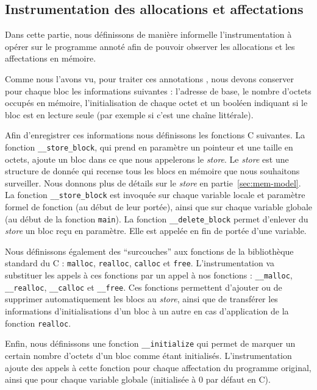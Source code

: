 \subsection{Instrumentation des allocations et affectations}


Dans cette partie, nous définissons de manière informelle l'instrumentation à
opérer sur le programme annoté afin de pouvoir observer les allocations et
les affectations en mémoire.

Comme nous l'avons vu, pour traiter ces annotations \eacsl, nous devons
conserver pour chaque bloc les informations suivantes : l'adresse de base, le
nombre d'octets occupés en mémoire, l'initialisation de chaque octet et un
booléen indiquant si le bloc est en lecture seule (par exemple si c'est une
chaîne littérale).

Afin d'enregistrer ces informations nous définissons les fonctions C suivantes.
La fonction \lstinline'__store_block', qui prend en paramètre un pointeur et une
taille en octets, ajoute un bloc dans ce que nous appelerons le \textit{store}.
Le \textit{store} est une structure de donnée qui recense tous les blocs en
mémoire que nous souhaitons surveiller.
Nous donnons plus de détails sur le \textit{store} en
partie~\ref{sec:mem-model}.
La fonction \lstinline'__store_block' est invoquée sur chaque variable locale
et paramètre formel de fonction (au début de leur portée), ainsi que sur chaque
variable globale (au début de la fonction \lstinline'main').
La fonction \lstinline'__delete_block' permet d'enlever du \textit{store} un
bloc reçu en paramètre.
Elle est appelée en fin de portée d'une variable.

Nous définissons également des ``surcouches'' aux fonctions de la bibliothèque
standard du C : \lstinline'malloc', \lstinline'realloc', \lstinline'calloc' et
\lstinline'free'.
L'instrumentation va substituer les appels à ces fonctions par un appel à nos
fonctions : \lstinline'__malloc', \lstinline'__realloc', \lstinline'__calloc'
et \lstinline'__free'.
Ces fonctions permettent d'ajouter ou de supprimer automatiquement les blocs
au \textit{store}, ainsi que de transférer les informations d'initialisations
d'un bloc à un autre en cas d'application de la fonction \lstinline'realloc'.

Enfin, nous définissons une fonction \lstinline'__initialize' qui permet de
marquer un certain nombre d'octets d'un bloc comme étant initialisés.
L'instrumentation ajoute des appels à cette fonction pour chaque affectation du
programme original, ainsi que pour chaque variable globale (initialisée à 0 par
défaut en C).


